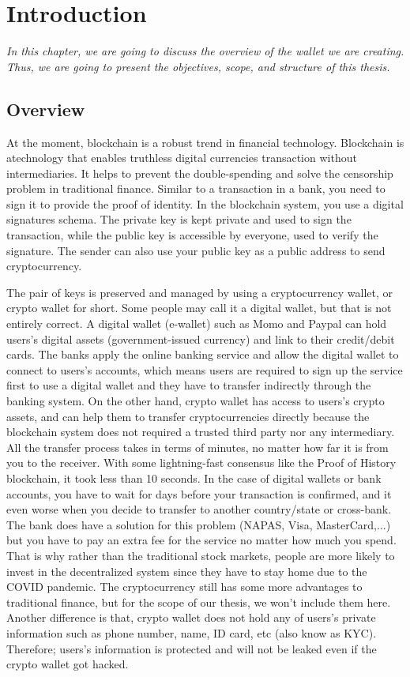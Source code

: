\chapter{Introduction} 
\label{Introduction}

\textit{In this chapter, we are going to discuss the overview of the wallet we are creating. Thus, we are going to present the objectives, scope, and structure of this thesis.}
\adjustmtc
\minitoc
\section{Overview}
\label{overview}
\bigskip

At the moment, blockchain is a robust trend in financial technology. Blockchain is atechnology that enables truthless digital currencies transaction without intermediaries. It helps to prevent the double-spending and solve the censorship problem in traditional finance. Similar to a transaction in a bank, you need to sign it to provide the proof of identity. In the blockchain system, you use a digital signatures schema. The private key is kept private and used to sign the transaction, while the public key is accessible by everyone, used to verify the signature. The sender can also use your public key as a public address to send cryptocurrency.

The pair of keys is preserved and managed by using a cryptocurrency wallet, or crypto wallet for short. Some people may call it a digital wallet, but that is not entirely correct. A digital wallet (e-wallet) such as Momo and Paypal can hold users’s digital assets (government-issued currency) and link to their credit/debit cards. The banks apply the online banking service and allow the digital wallet to connect to users’s accounts, which means users are required to sign up the service first to use a digital wallet and they have to transfer indirectly through the banking system. On the other hand, crypto wallet has access to users’s crypto assets, and can help them to transfer cryptocurrencies directly because the blockchain system does not required a trusted third party nor any intermediary. All the transfer process takes in terms of minutes, no matter how far it is from you to the receiver. With some lightning-fast consensus like the Proof of History blockchain, it took less than 10 seconds. In the case of digital wallets or bank accounts, you have to wait for days before your transaction is confirmed, and it even worse when you decide to transfer to another country/state or cross-bank. The bank does have a solution for this problem (NAPAS, Visa, MasterCard,...) but you have to pay an extra fee for the service no matter how much you spend. That is why rather than the traditional stock markets, people are more likely to invest in the decentralized system since they have to stay home due to the COVID pandemic. The cryptocurrency still has some more advantages to traditional finance, but for the scope of our thesis, we won’t include them here. Another difference is that, crypto wallet does not hold any of users’s private information such as phone number, name, ID card, etc (also know as KYC). Therefore; users’s information is protected and will not be leaked even if the crypto wallet got hacked.

